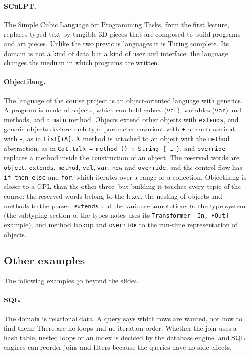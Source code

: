 \paragraph{SCuLPT.} The Simple Cubic Language for Programming Tasks, from the
first lecture, replaces typed text by tangible 3D pieces that are composed to
build programs and art pieces. Unlike the two previous languages it is Turing
complete. Its domain is not a kind of data but a kind of user and interface:
the language changes the medium in which programs are written.

\paragraph{Objectilang.} The language of the course project is an
object-oriented language with generics. A program is made of objects, which
can hold values (\texttt{val}), variables (\texttt{var}) and methods, and a
\texttt{main} method. Objects extend other objects with \texttt{extends}, and
generic objects declare each type parameter covariant with \texttt{+} or
contravariant with \texttt{-}, as in \texttt{List[+A]}. A method is attached to
an object with the \texttt{method} abstraction, as in
\texttt{Cat.talk = method () : String \{ \dots{} \}}, and \texttt{override}
replaces a method inside the construction of an object. The reserved words are
\texttt{object}, \texttt{extends}, \texttt{method}, \texttt{val}, \texttt{var},
\texttt{new} and \texttt{override}, and the control flow has
\texttt{if-then-else} and \texttt{for}, which iterates over a range or a
collection. Objectilang is closer to a GPL than the other three, but building
it touches every topic of the course: the reserved words belong to the lexer,
the nesting of objects and methods to the parser, \texttt{extends} and the
variance annotations to the type system (the subtyping section of the types
notes uses its \texttt{Transformer[-In, +Out]} example), and method lookup and
\texttt{override} to the run-time representation of objects.

\subsection{Other examples}

The following examples go beyond the slides.

\paragraph{SQL.} The domain is relational data. A query says which rows are
wanted, not how to find them:
There are no loops and no iteration order. Whether the join uses a hash table,
nested loops or an index is decided by the database engine, and SQL engines
can reorder joins and filters because the queries have no side effects.

